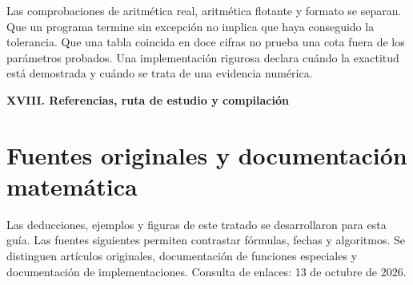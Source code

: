 \documentclass[11pt,a4paper]{article}
\theoremstyle{definition}
\newcommand{\parte}[1]{\par\bigskip\Needspace{8\baselineskip}\begin{center}{\Large\bfseries\color{azul}#1}\end{center}}
\begin{document}
Las comprobaciones de aritmética real, aritmética flotante y formato se separan. Que un programa termine sin excepción no implica que haya conseguido la tolerancia. Que una tabla coincida en doce cifras no prueba una cota fuera de los parámetros probados. Una implementación rigurosa declara cuándo la exactitud está demostrada y cuándo se trata de una evidencia numérica.

\parte{XVIII. Referencias, ruta de estudio y compilación}
\section{Fuentes originales y documentación matemática}
Las deducciones, ejemplos y figuras de este tratado se desarrollaron para esta guía. Las fuentes siguientes permiten contrastar fórmulas, fechas y algoritmos. Se distinguen artículos originales, documentación de funciones especiales y documentación de implementaciones. Consulta de enlaces: 13 de octubre de 2026.
\begingroup\small\raggedright\setlength{\parskip}{2pt}
\end{document}
